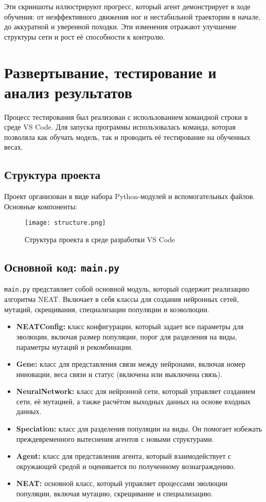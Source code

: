 \documentclass[a4paper,12pt]{article}
\begin{document}
Эти скриншоты иллюстрируют прогресс, который агент демонстрирует в ходе обучения: от неэффективного движения ног и нестабильной траектории в начале, до аккуратной и уверенной походки. Эти изменения отражают улучшение структуры сети и рост её способности к контролю.
\newpage
\section{Развертывание, тестирование и анализ результатов}

Процесс тестирования был реализован с использованием командной строки в среде VS Code. Для запуска программы использовалась команда, которая позволяла как обучать модель, так и проводить её тестирование на обученных весах.

\subsection{Структура проекта}

Проект организован в виде набора Python-модулей и вспомогательных файлов. Основные компоненты:

\begin{figure}[H]
	\centering
	\texttt{[image: structure.png]}
	\caption{Структура проекта в среде разработки VS Code}
	\label{fig:struct_screenshot}
\end{figure}
\subsection{Основной код: \texttt{main.py}}

\texttt{main.py} представляет собой основной модуль, который содержит реализацию алгоритма NEAT. Включает в себя классы для создания нейронных сетей, мутаций, скрещивания, специализации популяции и коэволюции.

\begin{itemize}
    \item \textbf{NEATConfig:} класс конфигурации, который задает все параметры для эволюции, включая размер популяции, порог для разделения на виды, параметры мутаций и рекомбинации.
    \item \textbf{Gene:} класс для представления связи между нейронами, включая номер инновации, веса связи и статус (включена или выключена связь).
    \item \textbf{NeuralNetwork:} класс для нейронной сети, который управляет созданием сети, её мутацией, а также расчётом выходных данных на основе входных данных.
    \item \textbf{Speciation:} класс для разделения популяции на виды. Он помогает избежать преждевременного вытеснения агентов с новыми структурами.
    \item \textbf{Agent:} класс для представления агента, который взаимодействует с окружающей средой и оценивается по полученному вознаграждению.
    \item \textbf{NEAT:} основной класс, который управляет процессами эволюции популяции, включая мутацию, скрещивание и специализацию.
\end{itemize}
\end{document}
